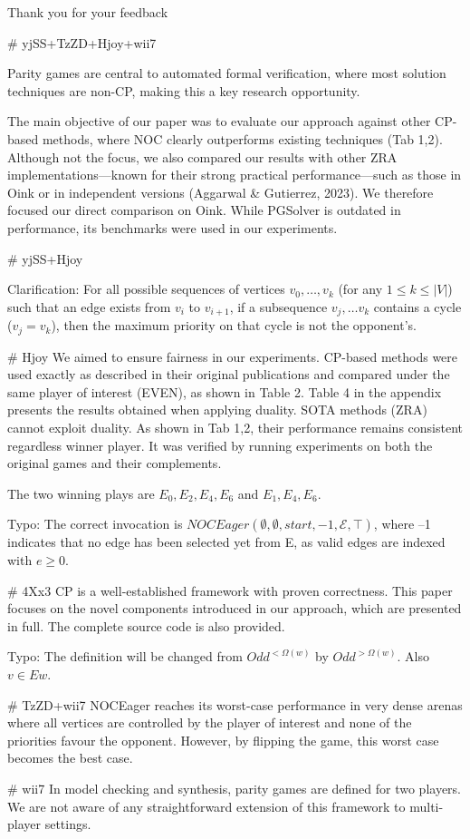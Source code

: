 \documentclass{article}
\begin{document}
Thank you for your feedback

# yjSS+TzZD+Hjoy+wii7

Parity games are central to automated formal verification, where most solution techniques are non-CP, making this a key research opportunity.

The main objective of our paper was to evaluate our approach against other CP-based methods, where NOC clearly outperforms existing techniques (Tab 1,2). Although not the focus, we also compared our results with other ZRA implementations—known for their strong practical performance—such as those in Oink or in independent versions (Aggarwal \& Gutierrez, 2023). We therefore focused our direct comparison on Oink. While PGSolver is outdated in performance, its benchmarks were used in our experiments.

# yjSS+Hjoy

Clarification: For all possible sequences of vertices $v_0,\ldots,v_k$ (for any $1\leq k\leq |V|$) such that an edge exists from $v_i$ to $v_{i+1}$, if a subsequence $v_j,\ldots v_k$ contains a cycle ($v_j=v_k$), then the maximum priority on that cycle is not the opponent's.

# Hjoy
We aimed to ensure fairness in our experiments. CP-based methods were used exactly as described in their original publications and compared under the same player of interest (EVEN), as shown in Table 2. Table 4 in the appendix presents the results obtained when applying duality. SOTA methods (ZRA) cannot exploit duality. As shown in Tab 1,2, their performance remains consistent regardless winner player. It was verified by running experiments on both the original games and their complements.

The two winning plays are $E_0,E_2,E_4,E_6$ and $E_1,E_4,E_6$.

Typo: The correct invocation is $NOCEager(\emptyset,\emptyset,start,-1,\mathcal{E},\top)$, where –1 indicates that no edge has been selected yet from E, as valid edges are indexed with $e \ge 0$.

# 4Xx3
CP is a well-established framework with proven correctness. This paper focuses on the novel components introduced in our approach, which are presented in full. The complete source code is also provided.

Typo: The definition will be changed from $Odd^{<\Omega(w)}$ by $Odd^{>\Omega(w)}$. Also $v \in Ew$.

# TzZD+wii7
NOCEager reaches its worst-case performance in very dense arenas where all vertices are controlled by the player of interest and none of the priorities favour the opponent. However, by flipping the game, this worst case becomes the best case.

# wii7
In model checking and synthesis, parity games are defined for two players. We are not aware of any straightforward extension of this framework to multi-player settings.
\end{document}
